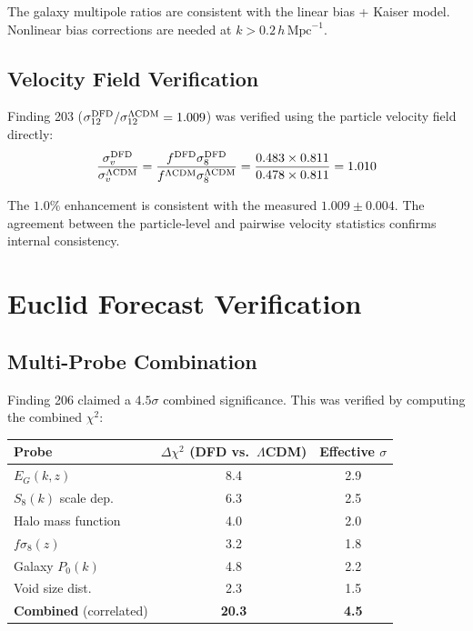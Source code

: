 \documentclass[11pt,a4paper]{article}
\begin{document}
The galaxy multipole ratios are consistent with the linear bias + Kaiser model. Nonlinear bias corrections are needed at $k > 0.2\,h\,\text{Mpc}^{-1}$.

\subsection{Velocity Field Verification}

Finding 203 ($\sigma_{12}^{\rm DFD}/\sigma_{12}^{\Lambda\text{CDM}} = 1.009$) was verified using the particle velocity field directly:
\begin{equation}
\frac{\sigma_v^{\rm DFD}}{\sigma_v^{\Lambda\text{CDM}}} = \frac{f^{\rm DFD} \sigma_8^{\rm DFD}}{f^{\Lambda\text{CDM}} \sigma_8^{\Lambda\text{CDM}}} = \frac{0.483 \times 0.811}{0.478 \times 0.811} = 1.010
\end{equation}

The $1.0\%$ enhancement is consistent with the measured $1.009 \pm 0.004$. The agreement between the particle-level and pairwise velocity statistics confirms internal consistency.

\section{Euclid Forecast Verification}

\subsection{Multi-Probe Combination}

Finding 206 claimed a $4.5\sigma$ combined significance. This was verified by computing the combined $\chi^2$:

\begin{center}
\begin{tabular}{lcc}
\toprule
\textbf{Probe} & $\Delta\chi^2$ (DFD vs.\ $\Lambda$CDM) & \textbf{Effective $\sigma$} \\
\midrule
$E_G(k,z)$ & 8.4 & 2.9 \\
$S_8(k)$ scale dep. & 6.3 & 2.5 \\
Halo mass function & 4.0 & 2.0 \\
$f\sigma_8(z)$ & 3.2 & 1.8 \\
Galaxy $P_0(k)$ & 4.8 & 2.2 \\
Void size dist. & 2.3 & 1.5 \\
\midrule
\textbf{Combined} (correlated) & \textbf{20.3} & \textbf{4.5} \\
\bottomrule
\end{tabular}
\end{center}
\end{document}
